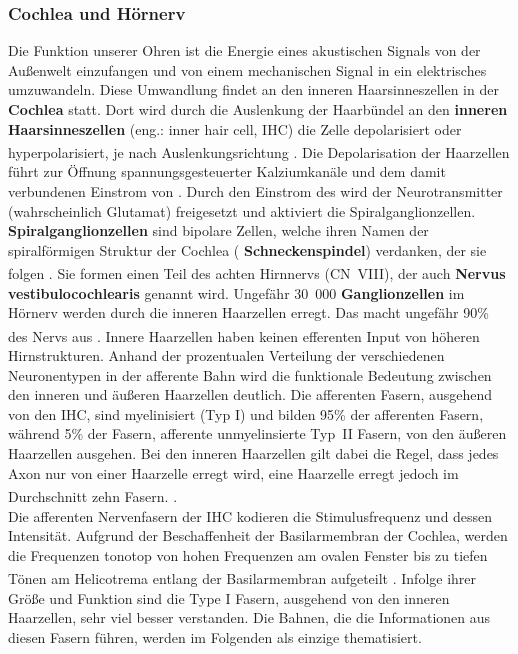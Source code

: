 \subsubsection*{Cochlea und Hörnerv}
Die Funktion unserer Ohren ist die Energie eines akustischen Signals von der Außenwelt einzufangen und von einem mechanischen Signal in ein elektrisches umzuwandeln. Diese Umwandlung findet an den inneren Haarsinneszellen in der \textbf{Cochlea} statt. Dort wird durch die Auslenkung der Haarbündel an den  \textbf{inneren Haarsinneszellen} (eng.: inner hair cell, IHC)  die Zelle depolarisiert oder hyperpolarisiert, je nach Auslenkungsrichtung \textsuperscript{\cite[Kap.~30]{kandel2013principles}}. Die Depolarisation der Haarzellen führt zur Öffnung spannungsgesteuerter Kalziumkanäle und dem damit verbundenen Einstrom von . Durch den Einstrom des  wird der Neurotransmitter (wahrscheinlich Glutamat) freigesetzt und aktiviert die Spiralganglionzellen.  \textbf{Spiralganglionzellen} sind bipolare Zellen, welche ihren Namen der spiralförmigen Struktur der Cochlea ( \textbf{Schneckenspindel})  verdanken, der sie folgen \textsuperscript{\cite[Kap.~11]{neurowissenschaften_baer}}. Sie formen einen Teil des achten Hirnnervs (CN~VIII), der auch  \textbf{Nervus vestibulocochlearis}  genannt wird. Ungefähr 30~000  \textbf{Ganglionzellen} im Hörnerv werden durch die inneren Haarzellen erregt. Das macht ungefähr 90\% des Nervs aus \textsuperscript{\cite[Kap.~30]{kandel2013principles}}. 
Innere Haarzellen haben keinen efferenten Input von höheren Hirnstrukturen. Anhand der prozentualen Verteilung der verschiedenen Neuronentypen in der afferente Bahn wird die funktionale Bedeutung zwischen den inneren und äußeren Haarzellen deutlich. Die afferenten Fasern, ausgehend von den IHC, sind myelinisiert (Typ I) und bilden 95\% der afferenten Fasern, während 5\% der Fasern, afferente unmyelinsierte Typ~II Fasern, von den äußeren Haarzellen ausgehen. Bei den inneren Haarzellen gilt dabei die Regel, dass jedes Axon nur von einer Haarzelle erregt wird, eine Haarzelle erregt jedoch im Durchschnitt zehn Fasern.  \textsuperscript{\cite[Kap.~30]{kandel2013principles}}.   
\\
\noindent Die afferenten Nervenfasern der IHC kodieren die Stimulusfrequenz und dessen Intensität. Aufgrund der Beschaffenheit der Basilarmembran  der Cochlea, werden die Frequenzen tonotop von hohen Frequenzen am ovalen Fenster bis zu tiefen Tönen am Helicotrema  entlang der Basilarmembran aufgeteilt \textsuperscript{\cite[Kap.~22]{paxinos2014rat}}. Infolge ihrer Größe und Funktion sind die Type I Fasern, ausgehend von den inneren Haarzellen, sehr viel besser verstanden. Die Bahnen, die die Informationen aus diesen Fasern führen, werden im Folgenden als einzige thematisiert.

